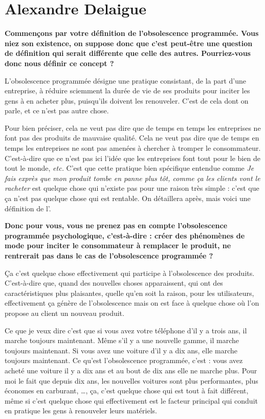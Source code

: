 \section{Alexandre Delaigue}
\label{InterviewADelaigue}

\vspace{2\baselineskip}

\begin{small}
\smallbreak\textbf{Commençons par votre définition de l'obsolescence programmée. Vous niez son existence, on suppose donc que c'est peut-être une question de définition qui serait différente que celle des autres.  Pourriez-vous donc nous définir ce concept ?
}\smallbreak 

L'obsolescence programmée désigne une pratique consistant, de la part d'une entreprise, à réduire sciemment la durée de vie de ses produits pour inciter les gens à en acheter plus, puisqu'ils doivent les renouveler. C'est de cela dont on parle, et ce n'est pas autre chose. 

Pour bien préciser, cela ne veut pas dire que de temps en temps les entreprises ne font pas des produits de mauvaise qualité. Cela ne veut pas dire que de temps en temps les entreprises ne sont pas amenées à chercher à tromper le consommateur. C'est-à-dire que ce n'est pas ici l'idée que les entreprises font tout pour le bien de tout le monde, \textit{etc.} C'est que cette pratique bien spécifique entendue comme \og \textit{Je fais exprès que mon produit tombe en panne plus tôt, comme ça les clients  vont le racheter }\fg{}   est quelque chose qui n'existe pas pour une raison très simple : c'est que ça n'est pas quelque chose qui est rentable. On détaillera après,  mais voici une définition de l'\op.

\textbf{
Donc pour vous, vous ne prenez pas en compte l'obsolescence programmée psychologique, c'est-à-dire  : créer des phénomènes de mode pour inciter le consommateur à remplacer le produit, ne rentrerait pas dans le cas de l'obsolescence programmée ? 
}\smallbreak

Ça c'est quelque chose effectivement qui participe à l'obsolescence des produits. C'est-à-dire que, quand des nouvelles choses apparaissent, qui ont des caractéristiques plus plaisantes, quelle qu'en soit la raison, pour les utilisateurs, effectivement ça génère de l'obsolescence mais on est face à quelque chose où l'on propose au client un nouveau produit. 

Ce que je veux dire c'est que si vous avez votre téléphone d'il y a trois ans, il marche toujours maintenant.  Même s'il y a une nouvelle gamme, il marche toujours maintenant. Si vous avez une voiture d'il y a dix ans, elle marche toujours maintenant. Ce qu'est l'obsolescence programmée, c'est : vous avez acheté une voiture il y a dix ans et au bout de dix ans elle ne marche plus. Pour moi le fait que depuis dix ans, les nouvelles voitures sont plus performantes, plus économes en carburant, \dots, ça, c'est quelque chose qui est tout à fait différent, même si c'est quelque chose qui effectivement est le facteur principal qui conduit en pratique les gens à renouveler leurs matériels.


\end{small}
